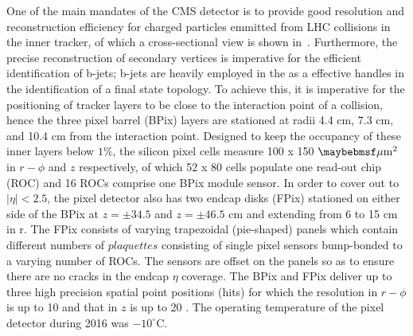 One of the main mandates of the CMS detector is to provide good resolution and reconstruction efficiency for charged particles emmitted from LHC collisions in the inner tracker, of which a cross-sectional view is shown in~. Furthermore, the precise reconstruction of secondary vertices is imperative for the efficient identification of b-jets; b-jets are heavily employed in the as a effective handles in the identification of a \ttll final state topology. To achieve this, it is imperative for the positioning of tracker layers to be close to the interaction point of a collision, hence the three pixel barrel (BPix) layers are stationed at radii 4.4 cm, 7.3 cm, and 10.4 cm from the interaction point. Designed to keep the occupancy of these inner layers below $1\%$, the silicon pixel cells measure 100 x 150 $\mum^2$ in $r-\phi$ and $z$ respectively, of which 52 x 80 cells populate one read-out chip (ROC) and 16 ROCs comprise one BPix module sensor. In order to cover out to $|\eta|<2.5$, the pixel detector also has two endcap disks (FPix) stationed on either side of the BPix at $z=\pm34.5$ and $z=\pm46.5$ cm and extending from 6 to 15 cm in r. The FPix consists of varying trapezoidal (pie-shaped) panels which contain different numbers of $plaquettes$ consisting of single pixel sensors bump-bonded to a varying number of ROCs. The sensors are offset on the panels so as to ensure there are no cracks in the endcap $\eta$ coverage. The BPix and FPix deliver up to three high precision spatial point positions (hits) for which the resolution in $r-\phi$ is up to 10 \mum and that in $z$ is up to 20 \mum. The operating temperature of the pixel detector during 2016 was $-10^\circ$C.

